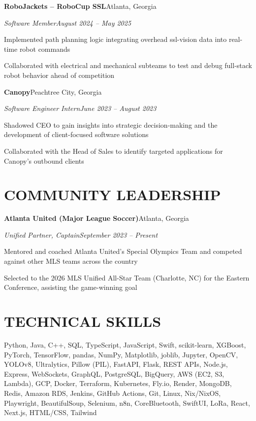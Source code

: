 \documentclass[letterpaper,10pt]{article}
\newcommand{\headerrow}[2]{\textbf{#1}\hfill #2\par}
\newcommand{\subrow}[2]{\textit{#1}\hfill \textit{#2}\par}
\newcommand{\gap}{\vspace{3pt}}
\begin{document}
\gap
\headerrow{RoboJackets -- RoboCup SSL}{Atlanta, Georgia}
\subrow{Software Member}{August 2024 -- May 2025}
\begin{tight}
  \item Implemented path planning logic integrating overhead ssl-vision data into real-time robot commands
  \item Collaborated with electrical and mechanical subteams to test and debug full-stack robot behavior ahead of competition
\end{tight}
\gap
\headerrow{Canopy}{Peachtree City, Georgia}
\subrow{Software Engineer Intern}{June 2023 -- August 2023}
\begin{tight}
  \item Shadowed CEO to gain insights into strategic decision-making and the development of client-focused software solutions
  \item Collaborated with the Head of Sales to identify targeted applications for Canopy's outbound clients
\end{tight}

\section{COMMUNITY LEADERSHIP}
\headerrow{Atlanta United (Major League Soccer)}{Atlanta, Georgia}
\subrow{Unified Partner, Captain}{September 2023 -- Present}
\begin{tight}
  \item Mentored and coached Atlanta United's Special Olympics Team and competed against other MLS teams across the country
  \item Selected to the 2026 MLS Unified All-Star Team (Charlotte, NC) for the Eastern Conference, assisting the game-winning goal
\end{tight}

\section{TECHNICAL SKILLS}
{\small
\justifying
Python, Java, C++, SQL, TypeScript, JavaScript, Swift, scikit-learn, XGBoost, PyTorch, TensorFlow, pandas, NumPy, Matplotlib, joblib, Jupyter, OpenCV, YOLOv8, Ultralytics, Pillow (PIL), FastAPI, Flask, REST APIs, Node.js, Express, WebSockets, GraphQL, PostgreSQL, BigQuery, AWS (EC2, S3, Lambda), GCP, Docker, Terraform, Kubernetes, Fly.io, Render, MongoDB, Redis, Amazon RDS, Jenkins, GitHub Actions, Git, Linux, Nix/NixOS, Playwright, BeautifulSoup, Selenium, n8n, CoreBluetooth, SwiftUI, LoRa, React, Next.js, HTML/CSS, Tailwind
\par}
\end{document}
